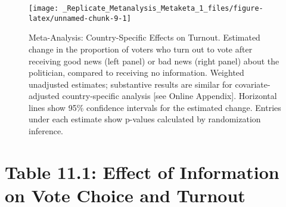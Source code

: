 \documentclass[]{article}
\begin{document}
\begin{figure}

{\centering \texttt{[image: \_Replicate\_Metanalysis\_Metaketa\_1\_files/figure-latex/unnamed-chunk-9-1]} 

}

\caption{Meta-Analysis: Country-Specific Effects on Turnout. Estimated change in the proportion of voters who turn out to vote after receiving good news (left panel) or bad news (right panel) about the politician, compared to receiving no information. Weighted unadjusted estimates; substantive results are similar for covariate-adjusted country-specific analysis [see Online Appendix]. Horizontal lines show 95\% confidence intervals for the estimated change. Entries under each estimate show p-values calculated by randomization inference.}\label{fig:unnamed-chunk-9}
\end{figure}

\clearpage

\section{Table 11.1: Effect of Information on Vote Choice and
Turnout}\label{table-11.1-effect-of-information-on-vote-choice-and-turnout}
\end{document}
